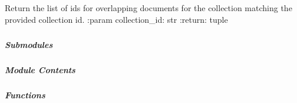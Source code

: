 \documentclass[letterpaper,10pt,english]{sphinxmanual}
\begin{document}

\begin{fulllineitems}
\label{\detokenize{autoapi/pine/backend/collections/index:pine.backend.collections.get_overlap_ids}}
\sphinxAtStartPar
Return the list of ids for overlapping documents for the collection matching the provided collection id.
:param collection\_id: str
:return: tuple

\end{fulllineitems}



\subparagraph{}
\label{\detokenize{autoapi/pine/backend/data/index:module-pine.backend.data}}\label{\detokenize{autoapi/pine/backend/data/index:pine-backend-data}}\label{\detokenize{autoapi/pine/backend/data/index::doc}}

\subparagraph{Submodules}
\label{\detokenize{autoapi/pine/backend/data/index:submodules}}

\subparagraph{}
\label{\detokenize{autoapi/pine/backend/data/bp/index:module-pine.backend.data.bp}}\label{\detokenize{autoapi/pine/backend/data/bp/index:pine-backend-data-bp}}\label{\detokenize{autoapi/pine/backend/data/bp/index::doc}}

\subparagraph{Module Contents}
\label{\detokenize{autoapi/pine/backend/data/bp/index:module-contents}}

\subparagraph{Functions}
\label{\detokenize{autoapi/pine/backend/data/bp/index:functions}}
\end{document}

